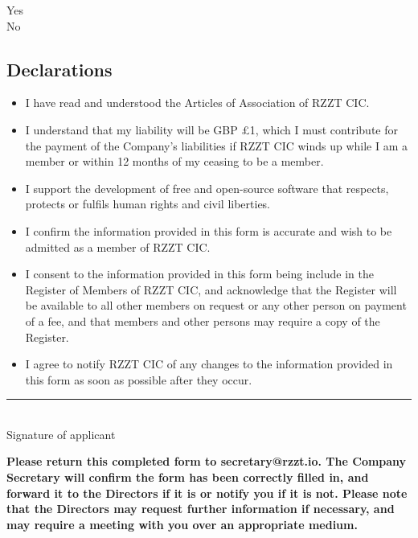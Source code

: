 \documentclass[a4paper,10pt]{article}
\begin{document}
\begin{Form}
\ChoiceMenu[radio,radiosymbol=\ding{108},name=criminaloffenceradio]{ }{ }Yes\\\vspace{0.5em}
\ChoiceMenu[radio,radiosymbol=\ding{108},name=criminaloffenceradio]{ }{ }No

\begin{framed}%
  \TextField[width=\textwidth,donotscroll=true,multiline=true,name=criminaloffence]{ }%
\end{framed}%

\subsection{Declarations}

\begin{itemize}
  \renewcommand{\labelitemi}{\CheckBox[name=articles]{ }}
  \item I have read and understood the Articles of Association of RZZT CIC.
  \renewcommand{\labelitemi}{\CheckBox[name=liability]{ }}
  \item I understand that my liability will be GBP £1, which I must contribute for the payment of the Company's liabilities if RZZT CIC winds up while I am a member or within 12 months of my ceasing to be a member.
  \renewcommand{\labelitemi}{\CheckBox[name=supportfoss]{ }}
  \item I support the development of free and open-source software that respects, protects or fulfils human rights and civil liberties.
  \renewcommand{\labelitemi}{\CheckBox[name=infoaccurate]{ }}
  \item I confirm the information provided in this form is accurate and wish to be admitted as a member of RZZT CIC.
  \renewcommand{\labelitemi}{\CheckBox[name=consent]{ }}
  \item I consent to the information provided in this form being include in the Register of Members of RZZT CIC, and acknowledge that the Register will be available to all other members on request or any other person on payment of a fee, and that members and other persons may require a copy of the Register.
  \renewcommand{\labelitemi}{\CheckBox[name=notify]{ }}
  \item I agree to notify RZZT CIC of any changes to the information provided in this form as soon as possible after they occur.
\end{itemize}

\vspace{\fill}
\rule{0.5\textwidth}{0.5pt}\\
Signature of applicant

\vspace{\fill}

\textbf{Please return this completed form to secretary@rzzt.io. The Company Secretary will confirm the form has been correctly filled in, and forward it to the Directors if it is or notify you if it is not. Please note that the Directors may request further information if necessary, and may require a meeting with you over an appropriate medium.}

\end{Form}
\end{document}
